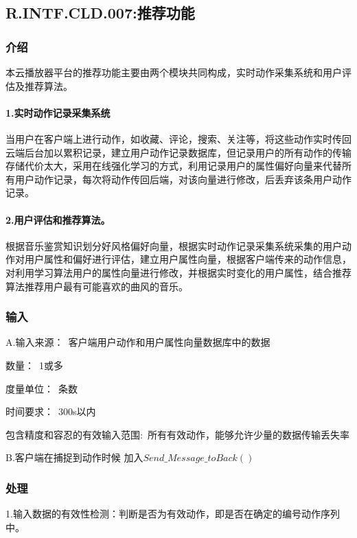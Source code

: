 
\subsection{R.INTF.CLD.007:推荐功能}
\subsubsection{介绍}
本云播放器平台的推荐功能主要由两个模块共同构成，实时动作采集系统和用户评估及推荐算法。

\paragraph{1.实时动作记录采集系统}

当用户在客户端上进行动作，如收藏、评论，搜索、关注等，将这些动作实时传回云端后台加以累积记录，建立用户动作记录数据库，但记录用户的所有动作的传输存储代价太大，采用在线强化学习的方式，利用记录用户的属性偏好向量来代替所有用户动作记录，每次将动作传回后端，对该向量进行修改，后丢弃该条用户动作记录。

\paragraph{2.用户评估和推荐算法。}

根据音乐鉴赏知识划分好风格偏好向量，根据实时动作记录采集系统采集的用户动作对用户属性和偏好进行评估，建立用户属性向量，根据客户端传来的动作信息，对利用学习算法用户的属性向量进行修改，并根据实时变化的用户属性，结合推荐算法推荐用户最有可能喜欢的曲风的音乐。

\subsubsection{输入}
A.输入来源：\  客户端用户动作和用户属性向量数据库中的数据

数量：\  1或多

度量单位：\ 条数

时间要求：\ 300s以内

包含精度和容忍的有效输入范围:\ 所有有效动作，能够允许少量的数据传输丢失率

B.客户端在捕捉到动作时候 加入$Send\_Message\_toBack()$
\subsubsection{处理}
1.输入数据的有效性检测：判断是否为有效动作，即是否在确定的编号动作序列中。

